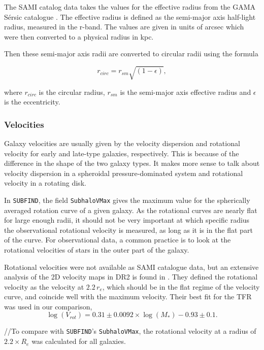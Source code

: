 The SAMI catalog data takes the values for the effective radius from the GAMA Sérsic catalogue \parencite{Driver2011}. The effective radius is defined as the semi-major axis half-light radius, measured in the r-band. The values are given in units of arcsec which were then converted to a physical radius in kpc.

Then these semi-major axis radii are converted to circular radii using the formula

\begin{equation}
   r_{circ} = r_{sm}\sqrt{(1-\epsilon)},
\end{equation}

where $r_{circ}$ is the circular radius, $r_{sm}$ is the semi-major axis effective radius and $\epsilon$ is the eccentricity.


\subsubsection{Velocities}

Galaxy velocities are usually given by the velocity dispersion and rotational velocity for early and late-type galaxies, respectively. This is because of the difference in the shape of the two galaxy types. It makes more sense to talk about velocity dispersion in a spheroidal pressure-dominated system and rotational velocity in a rotating disk.

In \texttt{SUBFIND}, the field \texttt{SubhaloVMax} gives the maximum value for the spherically averaged rotation curve of a given galaxy. As the rotational curves are nearly flat for large enough radii, it should not be very important at which specific radius the observational rotational velocity is measured, as long as it is in the flat part of the curve. For observational data, a common practice is to look at the rotational velocities of stars in the outer part of the galaxy. 

Rotational velocities were not available as SAMI catalogue data, but an extensive analysis of the 2D velocity maps in DR2 is found in \textcite{Bloom2017}. They defined the rotational velocity as the velocity at $2.2\, r_e$, which should be in the flat regime of the velocity curve, and coincide well with the maximum velocity. Their best fit for the TFR was used in our comparison, 
\begin{equation}
	\log(V_{rot}) = 0.31 \pm 0.0092 \times \log(M_*)-0.93 \pm 0.1.
\end{equation}

//To compare with \texttt{SUBFIND}'s \texttt{SubhaloVMax}, the rotational velocity at a radius of $2.2 \times R_e$ was calculated for all galaxies.



